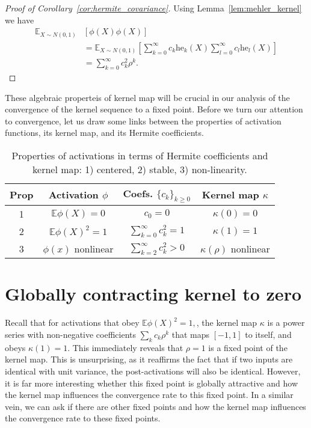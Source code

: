 \documentclass[twoside]{article}
\newcommand{\E}{\mathbb{E}}
\newcommand{\he}{\mathrm{he}}
\theoremstyle{definition}
\begin{document}
\begin{proof}[Proof of Corollary~\ref{cor:hermite_covariance}]
Using Lemma~\ref{lem:mehler_kernel} we have
\begin{align*}
\E_{X\sim N(0,1)} &\left[\phi(X)\phi(X)\right] \\
&= \E_{X\sim N(0,1)} \left[\sum_{k=0}^\infty c_k \he_k(X)\sum_{l=0}^\infty c_l \he_l(X)\right] \\
&= \sum_{k=0}^\infty c_k^2 \rho^k.
\end{align*}
\end{proof}

These algebraic properteis of kernel map will be crucial in our analysis of the convergence of the kernel sequence to a fixed point. Before we turn our attention to convergence, let us draw some links between the properties of activation functions, its kernel map, and its Hermite coefficients.

\begin{table}[ht]
\small 
    \centering
    \caption{Properties of activations in terms of Hermite coefficients and kernel map: 1) centered, 2) stable, 3) non-linearity. }
    \begin{tabular}{|c|c|c|c|}
    \hline 
 Prop & Activation $\phi$ & Coefs. $\{c_k\}_{k\ge 0}$ & Kernel map $\kappa$ \\
    \hline
 1 & $\E \phi(X)=0$ & $c_0 = 0$ & $\kappa(0) = 0$ \\
    \hline
 2 & $\E \phi(X)^2 = 1$ & $\sum_{k=0}^\infty c_k^2 = 1$ & $\kappa(1) = 1$ \\
    \hline
 3 & $\phi(x)$ nonlinear & $\sum_{k=2}^\infty c_k^2 > 0$ & $\kappa(\rho)$ nonlinear \\
    \hline
    \end{tabular}
\end{table}


\section{Globally contracting kernel to zero}

Recall that for activations that obey $\E \phi(X)^2 = 1,$, the kernel map  $\kappa$ is a power series with non-negative coefficients $\sum_k c_k \rho^k$ that maps $[-1,1]$ to itself, and obeys $\kappa(1)=1.$ This immediately reveals that $\rho=1$ is a fixed point of the kernel map. This is unsurprising, as it reaffirms the fact that if two inputs are identical with unit variance, the post-activations will also be identical. However, it is far more interesting whether this fixed point is globally attractive and how the kernel map influences the convergence rate to this fixed point. In a similar vein, we can ask if there are other fixed points and how the kernel map influences the convergence rate to these fixed points.
\end{document}
